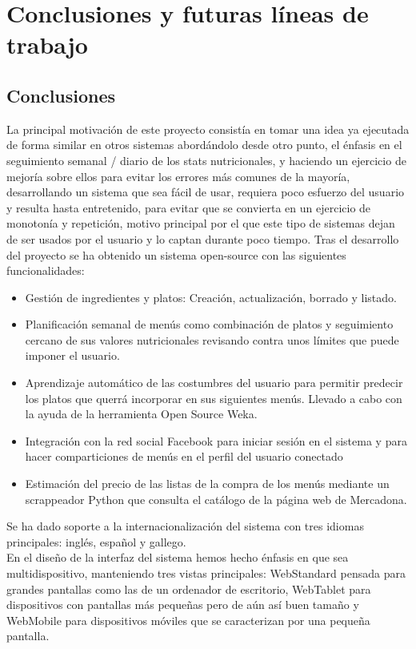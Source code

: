\documentclass[12pt, a4paper, twoside]{book}
\begin{document}
	\chapter{Conclusiones y futuras líneas de trabajo}
	\section{Conclusiones}
	La principal motivación de este proyecto consistía en tomar una idea ya ejecutada de forma similar en otros sistemas abordándolo desde otro punto, el énfasis en el seguimiento semanal / diario de los stats nutricionales, y haciendo un ejercicio de mejoría sobre ellos para evitar los errores más comunes de la mayoría, desarrollando un sistema que sea fácil de usar, requiera poco esfuerzo del usuario y resulta hasta entretenido, para evitar que se convierta en un ejercicio de monotonía y repetición, motivo principal por el que este tipo de sistemas dejan de ser usados por el usuario y lo captan durante poco tiempo.	
	Tras el desarrollo del proyecto se ha obtenido un sistema open-source con las siguientes funcionalidades:
	\begin{itemize}
		\item Gestión de ingredientes y platos: Creación, actualización, borrado y listado.
		\item Planificación semanal de menús como combinación de platos y seguimiento cercano de sus valores nutricionales revisando contra unos límites que puede imponer el usuario.
		\item Aprendizaje automático de las costumbres del usuario para permitir predecir los platos que querrá incorporar en sus siguientes menús. Llevado a cabo con la ayuda de la herramienta Open Source Weka.
		\item Integración con la red social Facebook para iniciar sesión en el sistema y para hacer comparticiones de menús en el perfil del usuario conectado
		\item Estimación del precio de las listas de la compra de los menús mediante un scrappeador Python que consulta el catálogo de la página web de Mercadona.
	\end{itemize}
	Se ha dado soporte a la internacionalización del sistema con tres idiomas principales: inglés, español y gallego.\\
	En el diseño de la interfaz del sistema hemos hecho énfasis en que sea multidispositivo, manteniendo tres vistas principales: WebStandard pensada para grandes pantallas como las de un ordenador de escritorio, WebTablet para dispositivos con pantallas más pequeñas pero de aún así buen tamaño y WebMobile para dispositivos móviles que se caracterizan por una pequeña pantalla.\\
\end{document}
